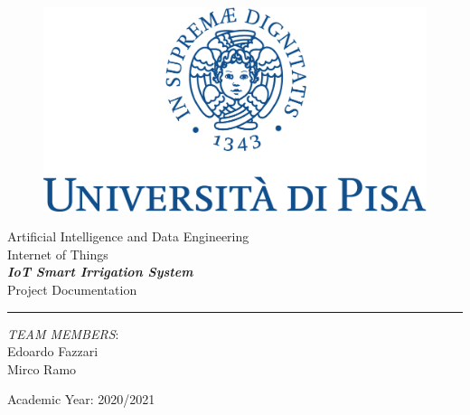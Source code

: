 \documentclass[11pt]{article}
\begin{document}
\begin{titlepage}
    \begin{center}
        \begin{figure}
            \includegraphics[width=\textwidth]{img/marchio_unipi_pant541-eps-converted-to.pdf}         
        \end{figure}
        {\Large
        Artificial Intelligence and Data Engineering\\
        \vspace{5mm} %
        Internet of Things}\\
        \vspace{30mm} %
        {\Huge\textbf{\textit{IoT Smart Irrigation System}}}\\
        \vspace{10mm} %
        {\Large Project Documentation}\\
        \par\noindent\rule{\textwidth}{0.4pt}
            \begin{flushright}
                \textit{TEAM MEMBERS}:\\
                Edoardo Fazzari\\ 
                Mirco Ramo\\
        	
            \end{flushright}
            \vfill
        Academic Year: 2020/2021\\        
    \end{center}
\end{titlepage} 
   
\tableofcontents





\end{document}
